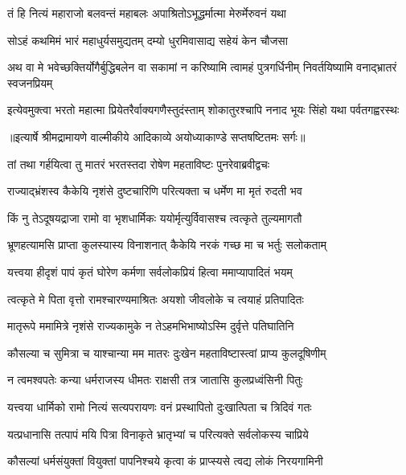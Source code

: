 \twolineshloka
{तं हि नित्यं महाराजो बलवन्तं महाबलः}
{अपाश्रितोऽभूद्धर्मात्मा मेरुर्मेरुवनं यथा} %

\twolineshloka
{सोऽहं कथमिमं भारं महाधुर्यसमुद्यतम्}
{दम्यो धुरमिवासाद्य सहेयं केन चौजसा} %

\threelineshloka
{अथ वा मे भवेच्छक्तिर्योगैर्बुद्धिबलेन वा}
{सकामां न करिष्यामि त्वामहं पुत्रगर्धिनीम्}
{निवर्तयिष्यामि वनाद्भ्रातरं स्वजनप्रियम्} %

\fourlineindentedshloka
{इत्येवमुक्त्वा भरतो महात्मा}
{प्रियेतरैर्वाक्यगणैस्तुदंस्ताम्}
{शोकातुरश्चापि ननाद भूयः}
{सिंहो यथा पर्वतगह्वरस्थः} %


{॥इत्यार्षे श्रीमद्रामायणे वाल्मीकीये आदिकाव्ये अयोध्याकाण्डे सप्तषष्टितमः सर्गः॥}


\twolineshloka
{तां तथा गर्हयित्वा तु मातरं भरतस्तदा}
{रोषेण महताविष्टः पुनरेवाब्रवीद्वचः} %

\twolineshloka
{राज्याद्भ्रंशस्व कैकेयि नृशंसे दुष्टचारिणि}
{परित्यक्ता च धर्मेण मा मृतं रुदती भव} %

\twolineshloka
{किं नु तेऽदूषयद्राजा रामो वा भृशधार्मिकः}
{ययोर्मृत्युर्विवासश्च त्वत्कृते तुल्यमागतौ} %

\twolineshloka
{भ्रूणहत्यामसि प्राप्ता कुलस्यास्य विनाशनात्}
{कैकेयि नरकं गच्छ मा च भर्तुः सलोकताम्} %

\twolineshloka
{यत्त्वया हीदृशं पापं कृतं घोरेण कर्मणा}
{सर्वलोकप्रियं हित्वा ममाप्यापादितं भयम्} %

\twolineshloka
{त्वत्कृते मे पिता वृत्तो रामश्चारण्यमाश्रितः}
{अयशो जीवलोके च त्वयाहं प्रतिपादितः} %

\twolineshloka
{मातृरूपे ममामित्रे नृशंसे राज्यकामुके}
{न तेऽहमभिभाष्योऽस्मि दुर्वृत्ते पतिघातिनि} %

\twolineshloka
{कौसल्या च सुमित्रा च याश्चान्या मम मातरः}
{दुःखेन महताविष्टास्त्वां प्राप्य कुलदूषिणीम्} %

\twolineshloka
{न त्वमश्वपतेः कन्या धर्मराजस्य धीमतः}
{राक्षसी तत्र जातासि कुलप्रध्वंसिनी पितुः} %

\twolineshloka
{यत्त्वया धार्मिको रामो नित्यं सत्यपरायणः}
{वनं प्रस्थापितो दुःखात्पिता च त्रिदिवं गतः} %

\twolineshloka
{यत्प्रधानासि तत्पापं मयि पित्रा विनाकृते}
{भ्रातृभ्यां च परित्यक्ते सर्वलोकस्य चाप्रिये} %

\twolineshloka
{कौसल्यां धर्मसंयुक्तां वियुक्तां पापनिश्चये}
{कृत्वा कं प्राप्स्यसे त्वद्य लोकं निरयगामिनी} %

